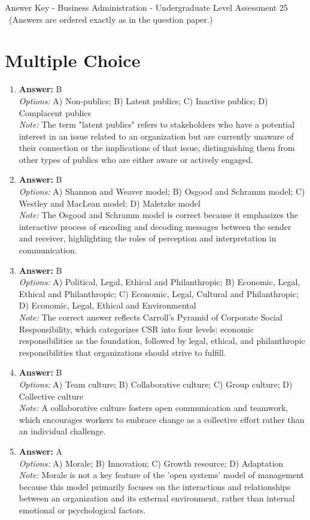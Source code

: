 \documentclass[12pt]{article}
\begin{document}
\begin{center}
Answer Key - Business Administration - Undergraduate Level Assessment 25 \
\small (Answers are ordered exactly as in the question paper.)
\end{center}

\section*{Multiple Choice}
\begin{enumerate}[label=\arabic*.]
\item \textbf{Answer:} B
\\ \textit{Options:} A) Non-publics; B) Latent publics; C) Inactive publics; D) Complacent publics
\\ \textit{Note:} The term "latent publics" refers to stakeholders who have a potential interest in an issue related to an organization but are currently unaware of their connection or the implications of that issue, distinguishing them from other types of publics who are either aware or actively engaged.
\item \textbf{Answer:} B
\\ \textit{Options:} A) Shannon and Weaver model; B) Osgood and Schramm model; C) Westley and MacLean model; D) Maletzke model
\\ \textit{Note:} The Osgood and Schramm model is correct because it emphasizes the interactive process of encoding and decoding messages between the sender and receiver, highlighting the roles of perception and interpretation in communication.
\item \textbf{Answer:} B
\\ \textit{Options:} A) Political, Legal, Ethical and Philanthropic; B) Economic, Legal, Ethical and Philanthropic; C) Economic, Legal, Cultural and Philanthropic; D) Economic, Legal, Ethical and Environmental
\\ \textit{Note:} The correct answer reflects Carroll's Pyramid of Corporate Social Responsibility, which categorizes CSR into four levels: economic responsibilities as the foundation, followed by legal, ethical, and philanthropic responsibilities that organizations should strive to fulfill.
\item \textbf{Answer:} B
\\ \textit{Options:} A) Team culture; B) Collaborative culture; C) Group culture; D) Collective culture
\\ \textit{Note:} A collaborative culture fosters open communication and teamwork, which encourages workers to embrace change as a collective effort rather than an individual challenge.
\item \textbf{Answer:} A
\\ \textit{Options:} A) Morale; B) Innovation; C) Growth resource; D) Adaptation
\\ \textit{Note:} Morale is not a key feature of the 'open systems' model of management because this model primarily focuses on the interactions and relationships between an organization and its external environment, rather than internal emotional or psychological factors.
\end{enumerate}
\end{document}
